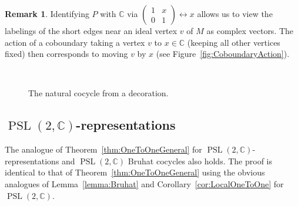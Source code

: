 \documentclass[11pt]{amsart}
\theoremstyle{plain}
\theoremstyle{definition}
\newtheorem{remark}[theorem]{Remark}
\numberwithin{equation}{section}
\newcommand{\C}{\mathbb C}
\newcommand{\Matrix}[4]{\left(\begin{smallmatrix}#1&#2\\#3&#4\end{smallmatrix}\right)}
\DeclareMathOperator{\PSL}{PSL}
\begin{document}
\begin{remark}\label{rm:CoboundaryAction}
Identifying $P$ with $\C$ via $\Matrix{1}{x}{0}{1}\leftrightarrow x$ allows us to view the labelings of the short edges near an ideal vertex $v$ of $M$ as complex vectors. The action of a coboundary taking a vertex $v$ to $x\in\C$ (keeping all other vertices fixed) then corresponds to moving $v$ by $x$ (see Figure~\ref{fig:CoboundaryAction}). %
\end{remark}


\begin{figure}[htb]
\hspace{0.5cm}\begin{minipage}[b]{0.3\textwidth}
\scalebox{0.75}{}
\end{minipage}
\begin{minipage}[b]{0.55\textwidth}
\scalebox{0.75}{}
\end{minipage}\\
\begin{minipage}[t]{0.48\textwidth}
\caption{The action by coboundary corresponds to moving the ``center'' point.}\label{fig:CoboundaryAction}
\end{minipage}
\begin{minipage}[t]{0.48\textwidth}
\caption{The natural cocycle from a decoration.}\label{fig:NaturalCocycleDefn}
\end{minipage}
\end{figure}



\subsection{$\PSL(2,\C)$-representations}
The analogue of Theorem~\ref{thm:OneToOneGeneral} for $\PSL(2,\C)$-representations and $\PSL(2,\C)$ Bruhat cocycles also holds. The proof is identical to that of Theorem~\ref{thm:OneToOneGeneral} using the obvious analogues of Lemma~\ref{lemma:Bruhat} and Corollary~\ref{cor:LocalOneToOne} for $\PSL(2,\C)$.
\end{document}

